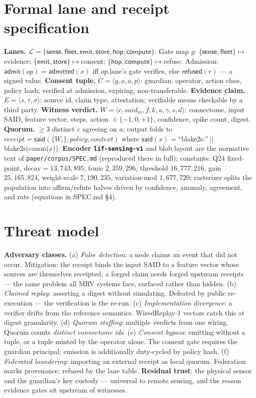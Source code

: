 \documentclass[pdflatex,sn-basic]{sn-jnl}
\begin{document}
\begin{appendices}
\section{Formal lane and receipt specification}\label{app:spec}
\textbf{Lanes.} $\mathcal{L}=\{\mathsf{sense},\mathsf{fleet},
\mathsf{emit},\mathsf{store},\mathsf{hop},\mathsf{compute}\}$.
Gate map $g$: $\{\mathsf{sense},\mathsf{fleet}\}\mapsto$evidence;
$\{\mathsf{emit},\mathsf{store}\}\mapsto$consent;
$\{\mathsf{hop},\mathsf{compute}\}\mapsto$refuse. Admission:
$\mathsf{admit}(op) = \mathsf{admitted}(x)$ iff $op.\text{lane}$'s gate
verifies, else $\mathsf{refused}(r)$ --- a signed value.
\textbf{Consent tuple.} $C=\langle g,o,a,p\rangle$: guardian,
operator, action class, policy hash; verified at admission, expiring,
non-transferable. \textbf{Evidence claim.} $E=\langle s,\tau,
\sigma\rangle$: source id, claim type, attestation; verifiable means
checkable by a third party. \textbf{Witness verdict.}
$W=\langle c,\mathit{said}_{in},f,k,a,\gamma,s,d\rangle$: connectome,
input SAID, feature vector, steps, action $\in\{-1,0,+1\}$,
confidence, spike count, digest. \textbf{Quorum.} $\ge3$ distinct $c$
agreeing on $a$; output folds to
$\mathit{receipt}=\mathsf{said}(\{W_i\},\mathit{policy},
\mathit{context})$ where $\mathsf{said}(x)=$``blake2s:''$\,||\,$
blake2s(canon($x$)).
\textbf{Encoder \texttt{lif-sensing-v1}} and blob layout are the
normative text of \texttt{paper/corpus/SPEC.md} (reproduced there in
full); constants: Q24 fixed-point,
$\mathrm{decay}=13{,}743{,}895$, tonic $2{,}359{,}296$,
threshold $16{,}777{,}216$, gain $25{,}165{,}824$,
weight-scale $7{,}190{,}235$, variation-mod $1{,}677{,}720$; rasterizer
splits the population into affirm/refute halves driven by
confidence, anomaly, agreement, and rate (equations in SPEC.md \S4).

\section{Threat model}\label{app:threat}
\textbf{Adversary classes.} (a) \emph{False detection}: a node claims
an event that did not occur. Mitigation: the receipt binds the input
SAID to a feature vector whose sources are themselves receipted; a
forged claim needs forged upstream receipts --- the same problem all
MRV systems face, surfaced rather than hidden. (b) \emph{Claimed
replay}: asserting a digest without simulating. Defeated by public
re-execution --- the verification is the re-run. (c)
\emph{Implementation divergence}: a verifier drifts from the
reference semantics. WiredReplay-1 vectors catch this at digest
granularity. (d) \emph{Quorum stuffing}: multiple verdicts from one
wiring. Quorum counts \emph{distinct connectome ids}. (e)
\emph{Consent bypass}: emitting without a tuple, or a tuple minted by
the operator alone. The consent gate requires the guardian principal;
emission is additionally duty-cycled by policy hash. (f)
\emph{Federated laundering}: importing an external receipt as local
quorum. Federation marks provenance; refused by the lane table.
\textbf{Residual trust}: the physical sensor and the guardian's key
custody --- universal to remote sensing, and the reason evidence
gates sit upstream of witnesses.


\end{appendices}
\end{document}

